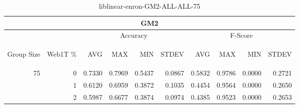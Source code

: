 \begin{center}
\begin{table}[htbp]
\begin{tabular}{ | r | r | r | r | r | r | r | r | r | r |}
\hline
\multicolumn{10}{|c|}{GM2}\\
\hline
 & & \multicolumn{4}{|c|}{Accuracy} & \multicolumn{4}{|c|}{F-Score}\\ \cline{3-10}
\begin{sideways}Group Size\end{sideways} & \begin{sideways}Web1T \%\end{sideways} & \begin{sideways}AVG\end{sideways} & \begin{sideways}MAX\end{sideways} & \begin{sideways}MIN\end{sideways} & \begin{sideways}STDEV\end{sideways} & \begin{sideways}AVG\end{sideways} & \begin{sideways}MAX\end{sideways} & \begin{sideways}MIN\end{sideways} & \begin{sideways}STDEV\end{sideways}\\
\hline
\multirow{2}{*}{75}
 & 0 & 0.7330 & 0.7969 & 0.5437 & 0.0867 & 0.5832 & 0.9786 & 0.0000 & 0.2721\\ \cline{2-10}
 & 1 & 0.6120 & 0.6959 & 0.3872 & 0.1035 & 0.4454 & 0.9564 & 0.0000 & 0.2650\\ \cline{2-10}
 & 2 & 0.5987 & 0.6677 & 0.3874 & 0.0974 & 0.4385 & 0.9523 & 0.0000 & 0.2653\\ \cline{2-10}
\hline
\end{tabular}
\caption{liblinear-enron-GM2-ALL-ALL-75}
\label{table:liblinear-enron-GM2-ALL-ALL-75}
\end{table}
\end{center}

